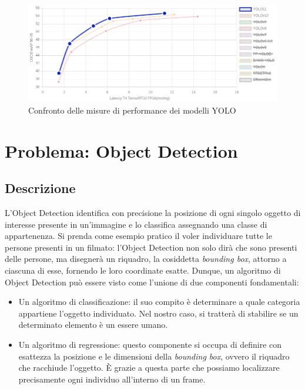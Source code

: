 \documentclass[12pt]{article}
\begin{document}
\begin{figure}[H]
    \centering
    \includegraphics[width=1.1\textwidth]{./img/yolo-model-comparison.png}
    \caption{Confronto delle misure di performance dei modelli YOLO}
    \label{fig:yolo-model-comparison}
\end{figure}

\section{Problema: Object Detection}
\subsection{Descrizione}
L'Object Detection identifica con precisione la posizione di ogni singolo oggetto di interesse presente in un'immagine e lo classifica assegnando una classe di appartenenza. Si prenda come esempio pratico il voler individuare tutte le persone presenti in un filmato: l'Object Detection non solo dirà che sono presenti delle persone, ma disegnerà un riquadro, la cosiddetta \textit{bounding box}, attorno a ciascuna di esse, fornendo le loro coordinate esatte.
Dunque, un algoritmo di Object Detection può essere visto come l'unione di due componenti fondamentali:
\begin{itemize}
    \item Un algoritmo di classificazione: il suo compito è determinare a quale categoria appartiene l'oggetto individuato. Nel nostro caso, si tratterà di stabilire se un determinato elemento è un essere umano.
    \item Un algoritmo di regressione: questo componente si occupa di definire con esattezza la posizione e le dimensioni della \textit{bounding box}, ovvero il riquadro che racchiude l'oggetto. È grazie a questa parte che possiamo localizzare precisamente ogni individuo all'interno di un frame.
\end{itemize}
\end{document}

